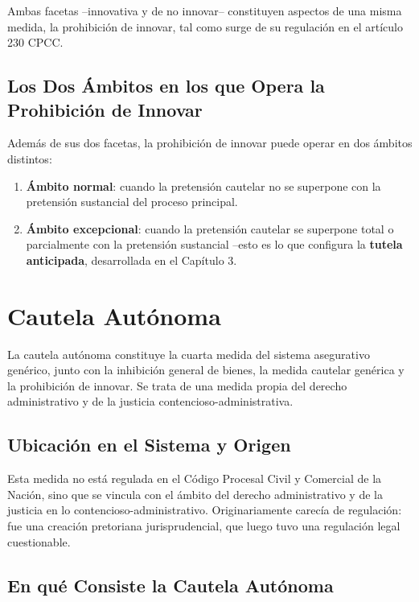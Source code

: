 \documentclass[12pt,oneside]{book}
\begin{document}
Ambas facetas --innovativa y de no innovar-- constituyen aspectos de una misma medida, la prohibición de innovar, tal como surge de su regulación en el artículo 230 CPCC.

\subsection{Los Dos Ámbitos en los que Opera la Prohibición de Innovar}

Además de sus dos facetas, la prohibición de innovar puede operar en dos ámbitos distintos:

\begin{enumerate}
    \item \textbf{Ámbito normal}: cuando la pretensión cautelar no se superpone con la pretensión sustancial del proceso principal.
    \item \textbf{Ámbito excepcional}: cuando la pretensión cautelar se superpone total o parcialmente con la pretensión sustancial --esto es lo que configura la \textbf{tutela anticipada}, desarrollada en el Capítulo 3.
\end{enumerate}

\section{Cautela Autónoma}

La cautela autónoma constituye la cuarta medida del sistema asegurativo genérico, junto con la inhibición general de bienes, la medida cautelar genérica y la prohibición de innovar. Se trata de una medida propia del derecho administrativo y de la justicia contencioso-administrativa.

\subsection{Ubicación en el Sistema y Origen}

Esta medida no está regulada en el Código Procesal Civil y Comercial de la Nación, sino que se vincula con el ámbito del derecho administrativo y de la justicia en lo contencioso-administrativo. Originariamente carecía de regulación: fue una creación pretoriana jurisprudencial, que luego tuvo una regulación legal cuestionable.

\subsection{En qué Consiste la Cautela Autónoma}
\end{document}
